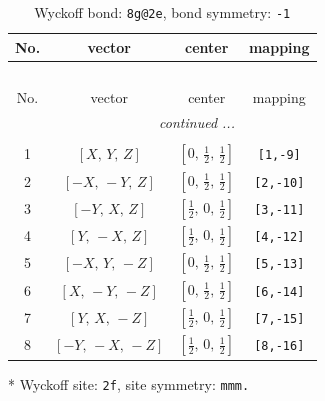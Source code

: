 \documentclass[fleqn,8pt]{jsarticle}
\begin{document}
\renewcommand{\arraystretch}{1.2}
\begin{longtable}{cccc}
\caption{Wyckoff bond: {\tt 8g@2e}, bond symmetry: {\tt -1}}
 \\
 \hline \hline
No. & vector & center & mapping \\ \hline \endfirsthead

\multicolumn{3}{l}{\tablename\ \thetable{}} \\
 \hline \hline
No. & vector & center & mapping \\ \hline \endhead

 \hline \hline
\multicolumn{3}{r}{\footnotesize\it continued ...} \\ \endfoot

 \hline \hline
\multicolumn{3}{r}{} \\ \endlastfoot

1 & $\left[ X,\, Y,\, Z \right]$ & $\left[ 0,\, \frac{1}{2},\, \frac{1}{2} \right]$ & {\tt [1,-9]} \\ \hline
2 & $\left[ - X,\, - Y,\, Z \right]$ & $\left[ 0,\, \frac{1}{2},\, \frac{1}{2} \right]$ & {\tt [2,-10]} \\ \hline
3 & $\left[ - Y,\, X,\, Z \right]$ & $\left[ \frac{1}{2},\, 0,\, \frac{1}{2} \right]$ & {\tt [3,-11]} \\ \hline
4 & $\left[ Y,\, - X,\, Z \right]$ & $\left[ \frac{1}{2},\, 0,\, \frac{1}{2} \right]$ & {\tt [4,-12]} \\ \hline
5 & $\left[ - X,\, Y,\, - Z \right]$ & $\left[ 0,\, \frac{1}{2},\, \frac{1}{2} \right]$ & {\tt [5,-13]} \\ \hline
6 & $\left[ X,\, - Y,\, - Z \right]$ & $\left[ 0,\, \frac{1}{2},\, \frac{1}{2} \right]$ & {\tt [6,-14]} \\ \hline
7 & $\left[ Y,\, X,\, - Z \right]$ & $\left[ \frac{1}{2},\, 0,\, \frac{1}{2} \right]$ & {\tt [7,-15]} \\ \hline
8 & $\left[ - Y,\, - X,\, - Z \right]$ & $\left[ \frac{1}{2},\, 0,\, \frac{1}{2} \right]$ & {\tt [8,-16]} \\
\end{longtable}
* Wyckoff site: {\tt 2f}, site symmetry: {\tt mmm.}
\renewcommand{\arraystretch}{1.2}
\end{document}
